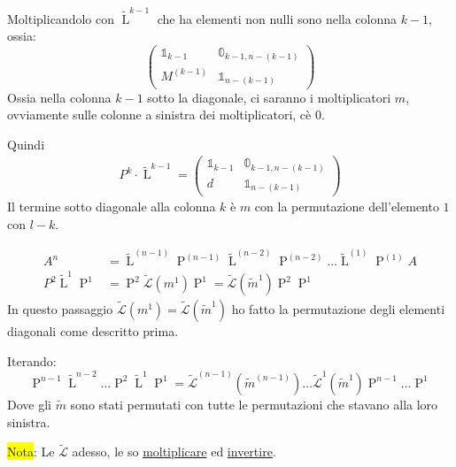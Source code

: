 \documentclass{article}
\begin{document}
Moltiplicandolo con $\widetilde{\operatorname{L}}^{k-1}$ che ha elementi non nulli sono nella colonna $k-1$, ossia:
\[\begin{pmatrix}
        \mathbb 1_{k-1} & \mathbb 0_{k-1,n-(k-1)} \\
        M^{(k-1)}       & \mathbb 1_{n-(k-1)}
    \end{pmatrix}\]
Ossia nella colonna $k-1$ sotto la diagonale, ci saranno i moltiplicatori $m$, ovviamente sulle colonne a sinistra dei moltiplicatori, cè $0$.

Quindi
\begin{align*}
    P^k\cdot \widetilde{\operatorname{L}}^{k-1}=\begin{pmatrix}
                                                    \mathbb 1_{k-1} & \mathbb 0_{k-1,n-(k-1)} \\
                                                    d               & \mathbb 1_{n-(k-1)}
                                                \end{pmatrix}
\end{align*}
Il termine sotto diagonale alla colonna $k$ è $m$ con la permutazione dell'elemento $1$ con $l-k$.

\begin{align*}
    A^n                                                 & =\widetilde{\operatorname{L}}^{(n-1)}\operatorname{P}^{(n-1)}\widetilde{\operatorname{L}}^{(n-2)}\operatorname{P}^{(n-2)}\dots\widetilde{\operatorname{L}}^{(1)}\operatorname{P}^{(1)}A \\
    P^2\widetilde{\operatorname{L}}^1\operatorname{P}^1 & =\operatorname{P}^2\widetilde{\mathcal{L}}(m^1)\operatorname{P}^1=\widetilde{\mathcal{L}}(\widetilde m^1)\operatorname{P}^2\operatorname{P}^1
\end{align*}
In questo passaggio $\widetilde{\mathcal{L}}(m^1)=\widetilde{\mathcal{L}}(\widetilde m^1)$ ho fatto la permutazione degli elementi diagonali come descritto prima.

Iterando:
\[\operatorname{P}^{n-1}\widetilde{\operatorname{L}}^{n-2}\dots\operatorname{P}^{2}\widetilde{\operatorname{L}}^{1}\operatorname{P}^1=\widetilde{\mathcal{L}}^{(n-1)}(\widetilde m^{(n-1)})\dots\widetilde{\mathcal{L}}^1(\widetilde m^1)\operatorname{P}^{n-1}\dots\operatorname{P}^1\]
Dove gli $\widetilde{m}$ sono stati permutati con tutte le permutazioni che stavano alla loro sinistra.

\colorbox{yellow}{Nota}: Le $\widetilde{\mathcal{L}}$ adesso, le so \underline{moltiplicare} ed \underline{invertire}.
\end{document}
